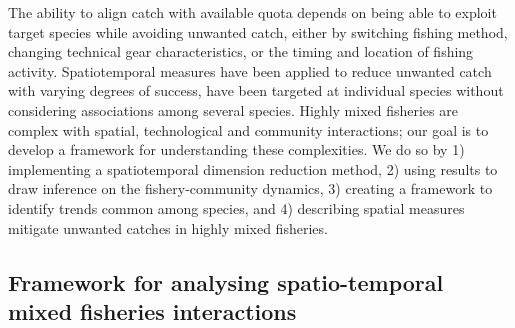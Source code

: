 \documentclass{nature}
\begin{document}
\begin{linenumbers}
The ability to align catch with available
quota depends on being able to exploit target species while avoiding unwanted
catch, either by switching fishing method, changing technical gear characteristics, or the timing and location of
fishing activity\cite{vanPutten2012a}. Spatiotemporal
measures have been applied to
reduce unwanted catch with varying degrees of success\cite{Needle2011,
	Dunn2014a}, 
 have been targeted at individual species
without considering associations among several
species. Highly mixed fisheries are complex with spatial, technological and
community interactions; our goal is to develop a framework for
understanding these complexities. We do so by 1) implementing a spatiotemporal
dimension reduction method, 2) using results to draw inference on
the fishery-community dynamics, 3) creating a framework to identify trends common
among species, and 4) describing  spatial measures
 mitigate unwanted
catches in highly mixed fisheries.


\subsection{Framework for analysing spatio-temporal mixed fisheries
	interactions}


\end{linenumbers}
\end{document}
